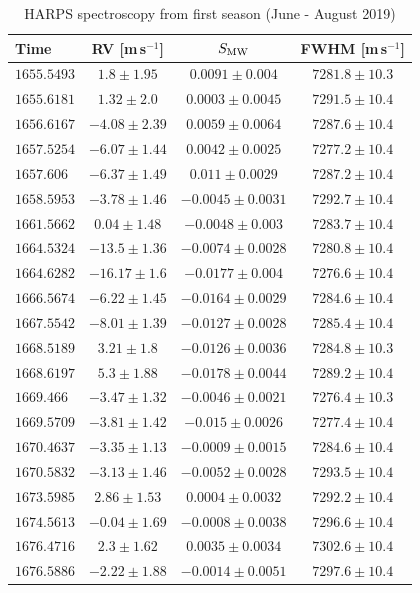 \documentclass[fleqn,usenatbib]{mnras}
\newcommand{\harps}{{HARPS}}
\newcommand{\ms}{m\,s$^{-1}$}
\begin{document}
\begin{table}
\caption{\harps{} spectroscopy from first season (June - August 2019)}
\label{Spec1}
\small
\begin{tabular}{lccc}
\hline
\hline
Time & RV [\ms{}] & $S_{\rm MW}$ & FWHM [\ms{}] \\
\hline
\hline
$1655.5493$ & $1.8\pm1.95$ & $0.0091\pm0.004$ & $7281.8\pm10.3$ \\
$1655.6181$ & $1.32\pm2.0$ & $0.0003\pm0.0045$ & $7291.5\pm10.4$ \\
$1656.6167$ & $-4.08\pm2.39$ & $0.0059\pm0.0064$ & $7287.6\pm10.4$ \\
$1657.5254$ & $-6.07\pm1.44$ & $0.0042\pm0.0025$ & $7277.2\pm10.4$ \\
$1657.606$ & $-6.37\pm1.49$ & $0.011\pm0.0029$ & $7287.2\pm10.4$ \\
$1658.5953$ & $-3.78\pm1.46$ & $-0.0045\pm0.0031$ & $7292.7\pm10.4$ \\
$1661.5662$ & $0.04\pm1.48$ & $-0.0048\pm0.003$ & $7283.7\pm10.4$ \\
$1664.5324$ & $-13.5\pm1.36$ & $-0.0074\pm0.0028$ & $7280.8\pm10.4$ \\
$1664.6282$ & $-16.17\pm1.6$ & $-0.0177\pm0.004$ & $7276.6\pm10.4$ \\
$1666.5674$ & $-6.22\pm1.45$ & $-0.0164\pm0.0029$ & $7284.6\pm10.4$ \\
$1667.5542$ & $-8.01\pm1.39$ & $-0.0127\pm0.0028$ & $7285.4\pm10.4$ \\
$1668.5189$ & $3.21\pm1.8$ & $-0.0126\pm0.0036$ & $7284.8\pm10.3$ \\
$1668.6197$ & $5.3\pm1.88$ & $-0.0178\pm0.0044$ & $7289.2\pm10.4$ \\
$1669.466$ & $-3.47\pm1.32$ & $-0.0046\pm0.0021$ & $7276.4\pm10.3$ \\
$1669.5709$ & $-3.81\pm1.42$ & $-0.015\pm0.0026$ & $7277.4\pm10.4$ \\
$1670.4637$ & $-3.35\pm1.13$ & $-0.0009\pm0.0015$ & $7284.6\pm10.4$ \\
$1670.5832$ & $-3.13\pm1.46$ & $-0.0052\pm0.0028$ & $7293.5\pm10.4$ \\
$1673.5985$ & $2.86\pm1.53$ & $0.0004\pm0.0032$ & $7292.2\pm10.4$ \\
$1674.5613$ & $-0.04\pm1.69$ & $-0.0008\pm0.0038$ & $7296.6\pm10.4$ \\
$1676.4716$ & $2.3\pm1.62$ & $0.0035\pm0.0034$ & $7302.6\pm10.4$ \\
$1676.5886$ & $-2.22\pm1.88$ & $-0.0014\pm0.0051$ & $7297.6\pm10.4$ \\

\end{tabular}
\end{table}
\end{document}

